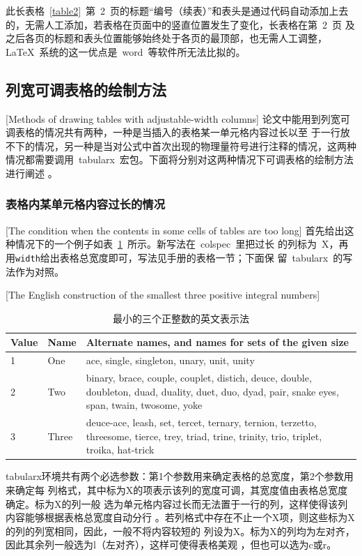 此长表格~\ref{table2}~第~2~页的标题“编号（续表）”和表头是通过代码自动添加上去的，无需人工添加，若表格在页面中的竖直位置发生了变化，长表格在第~2~页
及之后各页的标题和表头位置能够始终处于各页的最顶部，也无需人工调整，\LaTeX~系统的这一优点是~word~等软件所无法比拟的。

\subsection{列宽可调表格的绘制方法}[Methods of drawing tables with adjustable-width columns]
论文中能用到列宽可调表格的情况共有两种，一种是当插入的表格某一单元格内容过长以至
于一行放不下的情况，另一种是当对公式中首次出现的物理量符号进行注释的情况，这两种
情况都需要调用~tabularx~宏包。下面将分别对这两种情况下可调表格的绘制方法进行阐述
。
\subsubsection{表格内某单元格内容过长的情况}[The condition when the contents in
some cells of tables are too long]
首先给出这种情况下的一个例子如表~\ref{table3}~所示。新写法在~colspec~里把过长
的列标为~X，再用\verb|width|给出表格总宽度即可，写法见手册的表格一节；下面保
留~tabularx~的写法作为对照。
\begin{table}[htbp]
  \centering
\caption{最小的三个正整数的英文表示法}[The English construction of the smallest three positive integral numbers]\label{table3}
\begin{tabularx}{0.7\textwidth}{llX}
\toprule
Value & Name & Alternate names, and names for sets of the given size\\
\midrule
1 & One & ace, single, singleton, unary, unit, unity\\
2 & Two & binary, brace, couple, couplet, distich, deuce, double, doubleton, duad, duality, duet, duo, dyad, pair, snake eyes, span, twain, twosome, yoke\\
3 & Three & deuce-ace, leash, set, tercet, ternary, ternion, terzetto, threesome, tierce, trey, triad, trine, trinity, trio, triplet, troika, hat-trick\\
\bottomrule
\end{tabularx}
\end{table}
tabularx环境共有两个必选参数：第1个参数用来确定表格的总宽度，第2个参数用来确定每
列格式，其中标为X的项表示该列的宽度可调，其宽度值由表格总宽度确定。标为X的列一般
选为单元格内容过长而无法置于一行的列，这样使得该列内容能够根据表格总宽度自动分行
。若列格式中存在不止一个X项，则这些标为X的列的列宽相同，因此，一般不将内容较短的
列设为X。标为X的列均为左对齐，因此其余列一般选为l（左对齐），这样可使得表格美观
，但也可以选为c或r。

